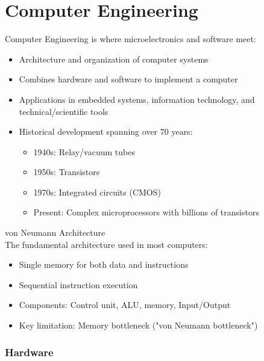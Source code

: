 \section{Computer Engineering}

\begin{concept}{Computer Engineering}
is where microelectronics and software meet:
\begin{itemize}
  \item Architecture and organization of computer systems
  \item Combines hardware and software to implement a computer
  \item Applications in embedded systems, information technology, and technical/scientific tools
  \item Historical development spanning over 70 years:
    \begin{itemize}
      \item 1940s: Relay/vacuum tubes
      \item 1950s: Transistors
      \item 1970s: Integrated circuits (CMOS)
      \item Present: Complex microprocessors with billions of transistors
    \end{itemize}
\end{itemize}
\end{concept}

\begin{theorem}{von Neumann Architecture}\\
The fundamental architecture used in most computers:
\begin{itemize}
  \item Single memory for both data and instructions
  \item Sequential instruction execution
  \item Components: Control unit, ALU, memory, Input/Output
  \item Key limitation: Memory bottleneck ("von Neumann bottleneck")
\end{itemize}
\end{theorem}

\subsubsection{Hardware}

